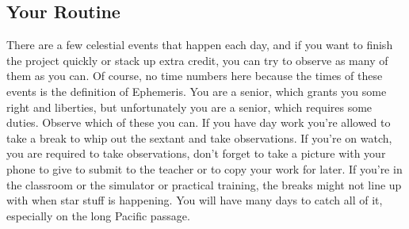 \documentclass[letterpaper,12pt]{article}
\begin{document}
\subsection{Your Routine}
There are a few celestial events that happen each day, and if you want to finish the project quickly or stack up extra credit, you can try to observe as many of them as you can.
Of course, no time numbers here because the times of these events is the definition of Ephemeris.
You are a senior, which grants you some right and liberties, but unfortunately you are a senior, which requires some duties.
Observe which of these you can.
If you have day work you're allowed to take a break to whip out the sextant and take observations.
If you're on watch, you are required to take observations, don't forget to take a picture with your phone to give to submit to the teacher or to copy your work for later.
If you're in the classroom or the simulator or practical training, the breaks might not line up with when star stuff is happening.
You will have many days to catch all of it, especially on the long Pacific passage.
\end{document}
